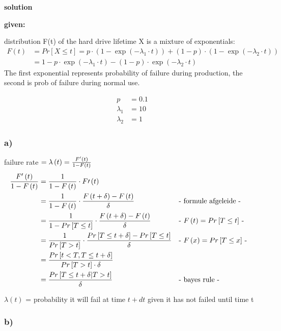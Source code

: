 \textbf{solution}

\textbf{given:}

distribution F(t) of the hard drive lifetime X is a mixture of exponentials:
\begin{align*}
F\left(t\right)&=Pr\left[X\le t\right]=p\cdot \left(1-\exp\left(-\lambda_{1}\cdot t\right)\right)+\left(1-p\right)\cdot \left(1-\exp\left(-\lambda_{2}\cdot t\right)\right)\\
&=1-p\cdot \exp\left(-\lambda_{1}\cdot t\right)-\left(1-p\right)\cdot \exp\left(-\lambda_{2}\cdot t\right)
\end{align*}
The first exponential represents probability of failure during production,
the second is prob of failure during normal use.

\begin{align*}
p&=0.1\\
\lambda_{1}&=10\\
\lambda_{2}&=1
\end{align*}

\subsubsection*{ a) }

failure rate $=\lambda \left(t\right)=\frac{F\sp{\prime} \left(t\right)}{1-F\left(t\right)}$
\begin{align*}
\frac{F\sp{\prime} \left(t\right)}{1-F\left(t\right)}&=\frac{1}{1-F\left(t\right)}\cdot F\prime \left(t\right)\\
&=\frac{1}{1-F\left(t\right)}\cdot \frac{F\left(t+\delta \right)-F\left(t\right)}{\delta }&& \text{-  formule afgeleide -}\\
&=\frac{1}{1-Pr\left[T\le t\right]}\cdot \frac{F\left(t+\delta \right)-F\left(t\right)}{\delta }&& \text{-  $F\left(t\right)=Pr\left[T\le t\right]$ -}\\
&=\frac{1}{Pr\left[T> t\right]}\cdot \frac{Pr\left[T\le t+\delta \right]-Pr\left[T\le t\right]}{\delta }&& \text{-  $F\left(x\right)=Pr\left[T\le x\right]$ -}\\
&=\frac{Pr\left[t< T,T\le t+\delta \right]}{Pr\left[T> t\right]\cdot \delta }\\
&=\frac{Pr\left[T\le t+\delta |T> t\right]}{\delta }&& \text{-  bayes rule -}
\end{align*}

$\lambda \left(t\right)$ = probability it will fail at time $t+dt$ given it has not failed until time t

\subsubsection*{ b) }

